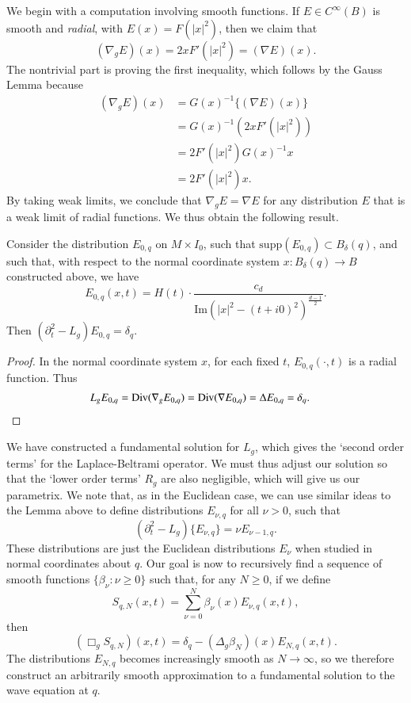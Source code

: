 We begin with a computation involving smooth functions. If $E \in C^\infty(B)$ is smooth and \emph{radial}, with $E(x) = F(|x|^2)$, then we claim that
%
\[ (\nabla_g E)(x) = 2 x F'(|x|^2) = (\nabla E)(x). \]
%
The nontrivial part is proving the first inequality, which follows by the Gauss Lemma because
%
\begin{align*}
    (\nabla_g E)(x) &= G(x)^{-1} \{ (\nabla E)(x) \}\\
    &= G(x)^{-1} \left( 2x F'(|x|^2) \right)\\
    &= 2 F'(|x|^2) G(x)^{-1} x\\
    &= 2 F'(|x|^2) x.
\end{align*}
%
By taking weak limits, we conclude that $\nabla_g E = \nabla E$ for any distribution $E$ that is a weak limit of radial functions. We thus obtain the following result.

\begin{lemma}
    Consider the distribution $E_{0,q}$ on $M \times I_0$, such that $\text{supp}(E_{0,q}) \subset B_\delta(q)$, and such that, with respect to the normal coordinate system $x: B_\delta(q) \to B$ constructed above, we have
    \[ E_{0,q}(x,t) = H(t) \cdot \frac{c_d}{\text{Im} \left( |x|^2 - (t + i0)^2 \right)^{\frac{d-1}{2}}}. \]
    Then $(\partial_t^2 - L_g) E_{0,q} = \delta_{q}$.
\end{lemma}
\begin{proof}
    In the normal coordinate system $x$, for each fixed $t$, $E_{0,q}(\cdot,t)$ is a radial function. Thus
    \begin{align*}
        L_g E_{0,q} &= \text{Div}(\nabla_g E_{0,q}) = \text{Div}( \nabla E_{0,q} ) = \Delta E_{0,q} = \delta_{q}. \qedhere
    \end{align*}
\end{proof}

We have constructed a fundamental solution for $L_g$, which gives the `second order terms' for the Laplace-Beltrami operator. We must thus adjust our solution so that the `lower order terms' $R_g$ are also negligible, which will give us our parametrix. We note that, as in the Euclidean case, we can use similar ideas to the Lemma above to define distributions $E_{\nu,q}$ for all $\nu > 0$, such that
%
\[ (\partial_t^2 - L_g) \{ E_{\nu,q} \} = \nu E_{\nu-1,q}. \]
%
These distributions are just the Euclidean distributions $E_\nu$ when studied in normal coordinates about $q$. Our goal is now to recursively find a sequence of smooth functions $\{ \beta_\nu : \nu \geq 0 \}$ such that, for any $N \geq 0$, if we define
%
\[ S_{q,N}(x,t) = \sum_{\nu = 0}^N \beta_\nu(x) E_{\nu,q}(x,t), \]
%
then
%
\[ (\Box_g S_{q,N})(x,t) = \delta_{q} - (\Delta_g \beta_N)(x) E_{N,q}(x,t). \]
%
The distributions $E_{N,q}$ becomes increasingly smooth as $N \to \infty$, so we therefore construct an arbitrarily smooth approximation to a fundamental solution to the wave equation at $q$.

